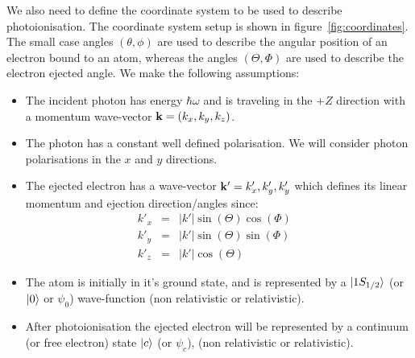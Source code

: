 We also need to define the coordinate system to be used to describe
photoionisation. The coordinate system setup is shown in figure~\ref{fig:coordinates}.
The small case angles $(\theta,\phi)$ are used to describe the
angular position of an electron bound to an atom, whereas the angles
$(\Theta,\Phi)$ are used to describe the electron ejected angle.
We make the following assumptions:
\begin{itemize}
    \item The incident photon has energy $\hbar \omega$ and is traveling
          in the $+Z$ direction with a momentum wave-vector 
          $\mathbf{k} = (k_x,k_y,k_z)$.
    \item The photon has a constant well defined polarisation. We will consider photon
          polarisations in the $x$ and $y$ directions. 
    \item The ejected electron has a wave-vector $\mathbf{k'} = {k'_x,k'_y,k'_y}$
          which defines its linear momentum and ejection direction/angles since:
          \begin{equation} \label{eq:ejection-angles}
          \begin{array}{cccc}
            k'_x & = & |k'| \sin(\Theta) \cos(\Phi) & \\
            k'_y & = & |k'| \sin(\Theta) \sin(\Phi) & \\
            k'_z & = & |k'| \cos(\Theta)&
          \end{array}
          \end{equation}
    \item The atom is initially in it's ground state, and is represented by a 
          $|1S_{1/2} \rangle$ (or $|0 \rangle$ or $\psi_0$) wave-function 
          (non relativistic or relativistic).
    \item After photoionisation the ejected electron will be represented by a
          continuum (or free electron) state $|c \rangle$ (or $\psi_c$), 
          (non relativistic or relativistic).
\end{itemize}


